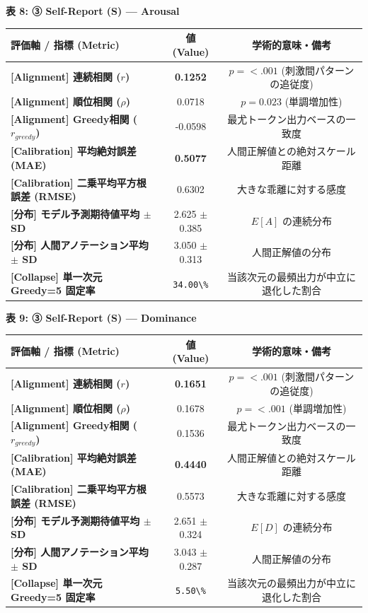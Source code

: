 \textbf{表 8: ③ Self-Report (S) — Arousal}
\begin{center}
\small
\begin{tabular}{lcc}
\toprule
\textbf{評価軸 / 指標 (Metric)} & \textbf{値 (Value)} & \textbf{学術的意味・備考} \\
\midrule
\textbf{[Alignment] 連続相関 ($r$)} & \textbf{0.1252} & $p = <.001 $ (刺激間パターンの追従度) \\
\textbf{[Alignment] 順位相関 ($\rho$)} & 0.0718 & $p = 0.023 $ (単調増加性) \\
\textbf{[Alignment] Greedy相関 ($r_{greedy}$)} & -0.0598 & 最尤トークン出力ベースの一致度 \\
\textbf{[Calibration] 平均絶対誤差 (MAE)} & \textbf{0.5077} & 人間正解値との絶対スケール距離 \\
\textbf{[Calibration] 二乗平均平方根誤差 (RMSE)} & 0.6302 & 大きな乖離に対する感度 \\
\textbf{[分布] モデル予測期待値平均 $\pm$ SD} & 2.625 $\pm$ 0.385 & $E[A]$ の連続分布 \\
\textbf{[分布] 人間アノテーション平均 $\pm$ SD} & 3.050 $\pm$ 0.313 & 人間正解値の分布 \\
\textbf{[Collapse] 単一次元 Greedy=5 固定率} & \texttt{34.00\textbackslash{}\%} & 当該次元の最頻出力が中立に退化した割合 \\
\bottomrule
\end{tabular}
\end{center}


\textbf{表 9: ③ Self-Report (S) — Dominance}
\begin{center}
\small
\begin{tabular}{lcc}
\toprule
\textbf{評価軸 / 指標 (Metric)} & \textbf{値 (Value)} & \textbf{学術的意味・備考} \\
\midrule
\textbf{[Alignment] 連続相関 ($r$)} & \textbf{0.1651} & $p = <.001 $ (刺激間パターンの追従度) \\
\textbf{[Alignment] 順位相関 ($\rho$)} & 0.1678 & $p = <.001 $ (単調増加性) \\
\textbf{[Alignment] Greedy相関 ($r_{greedy}$)} & 0.1536 & 最尤トークン出力ベースの一致度 \\
\textbf{[Calibration] 平均絶対誤差 (MAE)} & \textbf{0.4440} & 人間正解値との絶対スケール距離 \\
\textbf{[Calibration] 二乗平均平方根誤差 (RMSE)} & 0.5573 & 大きな乖離に対する感度 \\
\textbf{[分布] モデル予測期待値平均 $\pm$ SD} & 2.651 $\pm$ 0.324 & $E[D]$ の連続分布 \\
\textbf{[分布] 人間アノテーション平均 $\pm$ SD} & 3.043 $\pm$ 0.287 & 人間正解値の分布 \\
\textbf{[Collapse] 単一次元 Greedy=5 固定率} & \texttt{5.50\textbackslash{}\%} & 当該次元の最頻出力が中立に退化した割合 \\
\bottomrule
\end{tabular}
\end{center}


